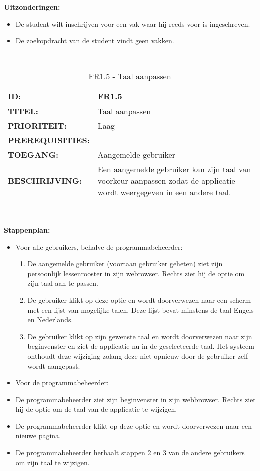 \textbf{Uitzonderingen:}
\begin{itemize}
\item De student wilt inschrijven voor een vak waar hij reeds voor is ingeschreven.
\item De zoekopdracht van de student vindt geen vakken.

\end{itemize}
\
\noindent\begin{table}[H]
            \begin{tabular}{l | p{10cm}}
                \textbf{ID:} & FR1.5 \\ \hline
                \textbf{TITEL:} & Taal aanpassen\\ \hline
                \textbf{PRIORITEIT:} &  Laag \\ \hline
                \textbf{PREREQUISITIES:} & \\ \hline
                \textbf{TOEGANG:} &  Aangemelde gebruiker \\ \hline
                \textbf{BESCHRIJVING:} & Een aangemelde gebruiker kan zijn taal van voorkeur aanpassen zodat de applicatie wordt weergegeven in een andere taal.\\
            \end{tabular}\\
            \caption{FR1.5 - Taal aanpassen}
            \label{tab:FR1.5 - Taal aanpassen}
        \end{table}
\textbf{Stappenplan:}
\begin{itemize}
\item Voor alle gebruikers, behalve de programmabeheerder:
	\begin{enumerate}
	\item De aangemelde gebruiker (voortaan gebruiker geheten) ziet zijn persoonlijk lessenrooster in zijn webrowser. Rechts ziet hij de optie om zijn taal aan te passen.
	\item De gebruiker klikt op deze optie en wordt doorverwezen naar een scherm met een lijst van mogelijke talen. Deze lijst bevat minstens de taal Engels en Nederlands.
	\item De gebruiker klikt op zijn gewenste taal en wordt doorverwezen naar zijn beginvenster en ziet de applicatie nu in de geselecteerde taal. Het systeem onthoudt deze wijziging zolang deze niet opnieuw door de gebruiker zelf wordt aangepast.
	\end{enumerate}
\item Voor de programmabeheerder:
	\item De programmabeheerder ziet zijn beginvenster in zijn webbrowser. Rechts ziet hij de optie om de taal van de applicatie te wijzigen.
	\item De programmabeheerder klikt op deze optie en wordt doorverwezen naar een nieuwe pagina. 
	\item De programmabeheerder herhaalt stappen 2 en 3 van de andere gebruikers om zijn taal te wijzigen.
\end{itemize}

